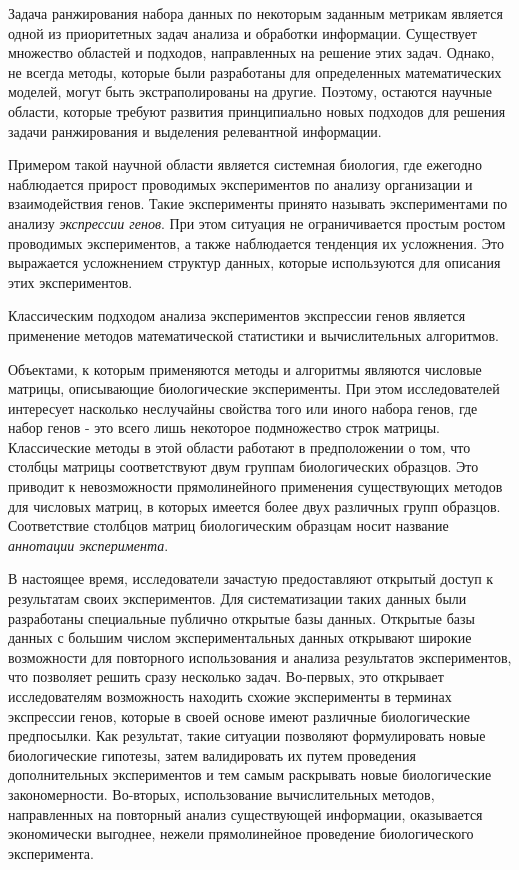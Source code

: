
{\actuality} Задача ранжирования набора данных по некоторым заданным метрикам является одной из приоритетных задач анализа и обработки информации.
Существует множество областей и подходов, направленных на решение этих задач.
Однако, не всегда методы, которые были разработаны для определенных математических моделей, могут быть экстраполированы на другие.
Поэтому, остаются научные области, которые требуют развития принципиально новых подходов для решения задачи ранжирования и выделения релевантной информации.


Примером такой научной области является системная биология, где ежегодно наблюдается прирост проводимых экспериментов по анализу организации и взаимодействия генов.
Такие эксперименты принято называть экспериментами по анализу \textit{экспрессии генов}.
При этом ситуация не ограничивается простым ростом проводимых экспериментов, а также наблюдается тенденция их усложнения.
Это выражается усложнением структур данных, которые используются для описания этих экспериментов.

Классическим подходом анализа экспериментов экспрессии генов является применение методов математической статистики и вычислительных алгоритмов.

Объектами, к которым применяются методы и алгоритмы являются числовые матрицы, описывающие биологические эксперименты.
При этом исследователей интересует насколько неслучайны свойства того или иного набора генов, где набор генов - это всего лишь некоторое подмножество строк матрицы.
Классические методы в этой области работают в предположении о том, что столбцы матрицы соответствуют двум группам биологических образцов.
Это приводит к невозможности прямолинейного применения существующих методов для числовых матриц, в которых имеется более двух различных групп образцов.
Соответствие столбцов матриц биологическим образцам носит название \textit{аннотации эксперимента}.


В настоящее время, исследователи зачастую предоставляют открытый доступ к результатам своих экспериментов.
Для систематизации таких данных были разработаны специальные публично открытые базы данных.
Открытые базы данных с большим числом экспериментальных данных открывают широкие возможности для повторного использования и анализа результатов экспериментов, что позволяет решить сразу несколько задач.
Во-первых, это открывает исследователям возможность находить схожие эксперименты в терминах экспрессии генов, которые в своей основе имеют различные биологические предпосылки.
Как результат, такие ситуации позволяют формулировать новые биологические гипотезы, затем валидировать их путем проведения дополнительных экспериментов и тем самым раскрывать новые биологические закономерности.
Во-вторых, использование вычислительных методов, направленных на повторный анализ существующей информации, оказывается экономически выгоднее, нежели прямолинейное проведение биологического эксперимента.



